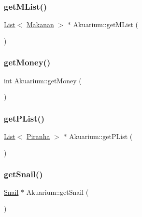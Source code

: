 \mbox{\label{class_akuarium_aceb32b9271d3de1c5383151d68a16cdb}} 
\subsubsection{\texorpdfstring{get\+M\+List()}{getMList()}}
{\footnotesize\ttfamily \mbox{\hyperlink{class_list}{List}}$<$ \mbox{\hyperlink{class_makanan}{Makanan}} $>$ $\ast$ Akuarium\+::get\+M\+List (\begin{DoxyParamCaption}{ }\end{DoxyParamCaption})}

\mbox{\label{class_akuarium_a641dd24ff82bc9eab91c119cef4ac06c}} 
\subsubsection{\texorpdfstring{get\+Money()}{getMoney()}}
{\footnotesize\ttfamily int Akuarium\+::get\+Money (\begin{DoxyParamCaption}{ }\end{DoxyParamCaption})}

\mbox{\label{class_akuarium_ad6e04ad77928d85f6739b76c9efaaa67}} 
\subsubsection{\texorpdfstring{get\+P\+List()}{getPList()}}
{\footnotesize\ttfamily \mbox{\hyperlink{class_list}{List}}$<$ \mbox{\hyperlink{class_piranha}{Piranha}} $>$ $\ast$ Akuarium\+::get\+P\+List (\begin{DoxyParamCaption}{ }\end{DoxyParamCaption})}

\mbox{\label{class_akuarium_a846c24525e4bec5b355e34924d8a5784}} 
\subsubsection{\texorpdfstring{get\+Snail()}{getSnail()}}
{\footnotesize\ttfamily \mbox{\hyperlink{class_snail}{Snail}} $\ast$ Akuarium\+::get\+Snail (\begin{DoxyParamCaption}{ }\end{DoxyParamCaption})}


